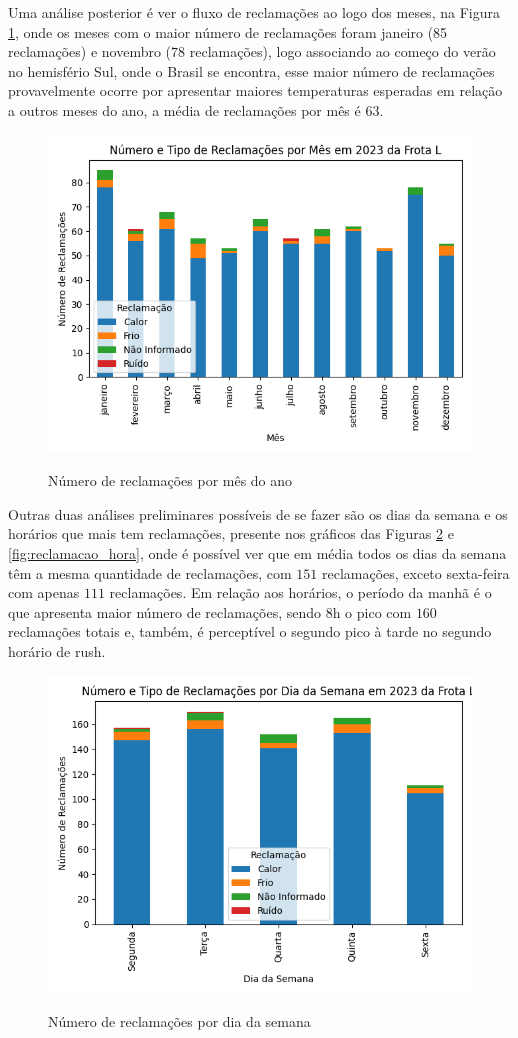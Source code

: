 \documentclass[acronym,symbols,table]{fei}
\begin{document}
Uma análise posterior é ver o fluxo de reclamações ao logo dos meses, na Figura \ref{fig:reclamacao_mes}, onde os meses com o maior número de reclamações foram janeiro (85 reclamações) e novembro ($78$ reclamações), logo associando ao começo do verão no hemisfério Sul, onde o Brasil se encontra, esse maior número de reclamações provavelmente ocorre por apresentar maiores temperaturas esperadas em relação a outros meses do ano, a média de reclamações por mês é $63$.

\begin{figure}[!htb]
    \centering
    \caption{Número de reclamações por mês do ano}
    \includegraphics[width=0.7\linewidth]{Imagens/reclamacao_mes.png}
    \label{fig:reclamacao_mes}
\end{figure}
\newpage
Outras duas análises preliminares possíveis de se fazer são os dias da semana e os horários que mais tem reclamações, presente nos gráficos das Figuras \ref{fig:reclamacao_semana} e \ref{fig:reclamacao_hora}, onde é possível ver que em média todos os dias da semana têm a mesma quantidade de reclamações, com $151$ reclamações, exceto sexta-feira com apenas $111$ reclamações. Em relação aos horários, o período da manhã é o que apresenta maior número de reclamações, sendo 8h o pico com $160$ reclamações totais e, também, é perceptível o segundo pico à tarde no segundo horário de rush.

\begin{figure}[!htb]
    \centering
    \caption{Número de reclamações por dia da semana}
    \includegraphics[width=0.7\linewidth]{Imagens/reclamacao_semana.png}
    \label{fig:reclamacao_semana}
\end{figure}
\end{document}
